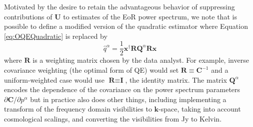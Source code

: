 \documentclass[preprint2,numberedappendix,tighten]{aastex6}  %
\newcommand{\C}{\mathbf{C}}
\begin{document}
Motivated by the desire to retain the advantageous behavior of suppressing contributions of $\mathbf{U}$ to estimates of the EoR power spectrum, we note that is possible to define a modified version of the quadratic estimator 
where Equation \eqref{eq:OQEQuadratic} is replaced by
\begin{equation}
\label{eq:qhat}
\widehat{q}^{\alpha} = \frac{1}{2}\textbf{x}^{\dagger}\textbf{R}\textbf{Q}^{\alpha}\textbf{R}\textbf{x}
\end{equation}
where $\textbf{R}$ is a weighting matrix chosen by the data analyst.  For example, inverse covariance weighting (the optimal form of QE) would set $\textbf{R} \equiv \textbf{C}^{-1}$ and a uniform-weighted case would use $\textbf{R} \equiv \textbf{I}$, the identity matrix.
The matrix $\textbf{Q}^{\alpha}$ encodes the dependence of the covariance on the power spectrum parameters $\partial \C/\partial p^\alpha$ but in practice also does other things, including implementing a transform of the frequency domain visibilities to $\mathbf{k}$-space, taking into account cosmological scalings, and converting the visibilities from Jy to Kelvin.
\end{document}
